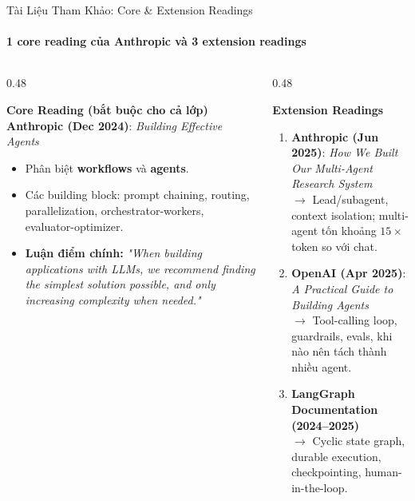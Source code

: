 \documentclass[aspectratio=1610,10pt,xcolor={table}]{beamer}
\begin{document}
\begin{frame}{Tài Liệu Tham Khảo: Core \& Extension Readings}
  \framesubtitle{1 core reading của Anthropic và 3 extension readings}

  \begin{columns}[t]
    \begin{column}{0.48\textwidth}
      \begin{block}{\textbf{Core Reading (bắt buộc cho cả lớp)}}
        \footnotesize
        \textbf{Anthropic (Dec 2024)}: \textit{Building Effective Agents}\\
        \begin{itemize}\scriptsize
          \item Phân biệt \textbf{workflows} và \textbf{agents}.
          \item Các building block: prompt chaining, routing, parallelization, orchestrator-workers, evaluator-optimizer.
          \item \textbf{Luận điểm chính:}
                \textit{"When building applications with LLMs, we recommend finding the simplest solution possible, and only increasing complexity when needed."}
        \end{itemize}
      \end{block}
    \end{column}

    \begin{column}{0.48\textwidth}
      \begin{alertblock}{\textbf{Extension Readings}}
        \footnotesize
        \begin{enumerate}\scriptsize
          \item \textbf{Anthropic (Jun 2025)}: \textit{How We Built Our Multi-Agent Research System}\\
                $\to$ Lead/subagent, context isolation; multi-agent tốn khoảng $15\times$ token so với chat.
          \item \textbf{OpenAI (Apr 2025)}: \textit{A Practical Guide to Building Agents}\\
                $\to$ Tool-calling loop, guardrails, evals, khi nào nên tách thành nhiều agent.
          \item \textbf{LangGraph Documentation (2024--2025)}\\
                $\to$ Cyclic state graph, durable execution, checkpointing, human-in-the-loop.
        \end{enumerate}
      \end{alertblock}
    \end{column}
  \end{columns}


\end{frame}
\end{document}
